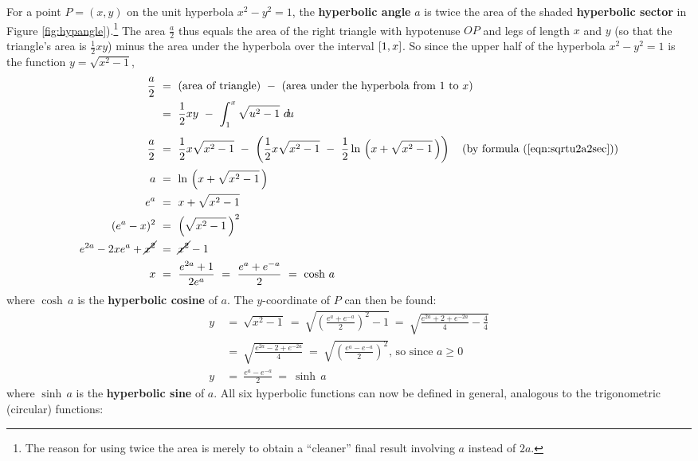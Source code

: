 For a point $P=(x,y)$ on the unit hyperbola $x^2-y^2=1$, the \textbf{hyperbolic
angle} $a$ is twice the area of the shaded
\textbf{hyperbolic sector} in Figure
\ref{fig:hypangle}).\footnote{The reason for using twice the area is
merely to obtain a ``cleaner'' final result involving $a$ instead of $2a$.} The
area $\frac{a}{2}$ thus equals the area of the right
triangle with hypotenuse $OP$ and legs of length $x$ and $y$ (so that the
triangle's area is $\frac{1}{2}xy$) minus the area under the hyperbola over the
interval $\lbrack 1,x \rbrack$. So since the upper half of the hyperbola $x^2-y^2=1$
is the function $y=\sqrt{x^2-1}$,
\begin{align*}
\frac{a}{2} ~&=~ \text{(area of triangle)} ~-~
                 \text{(area under the hyperbola from $1$ to $x$)}\\
&=~ \frac{1}{2}xy ~-~ \int_1^x \sqrt{u^2-1}~d\!u\\[4pt]
\frac{a}{2} ~&=~ \frac{1}{2}x\sqrt{x^2-1} ~-~ \left(\frac{1}{2}x\sqrt{x^2-1} ~-~
    \frac{1}{2}\ln\,\left(x + \sqrt{x^2-1}\,\right)\right)
    \quad\text{(by formula (\ref{eqn:sqrtu2a2sec}))}\\[2pt]
a ~&=~ \ln\,\left(x + \sqrt{x^2-1}\,\right)\\
e^a ~&=~ x + \sqrt{x^2-1}\\
(e^a - x)^2 ~&=~ \left(\sqrt{x^2-1}\,\right)^2\\
e^{2a} - 2xe^a + \cancel{x^2} ~&=~ \cancel{x^2} - 1\\
x ~&=~ \frac{e^{2a} + 1}{2e^a} ~=~ \frac{e^a + e^{-a}}{2} ~=~ \cosh\,a
\end{align*}
where $\cosh\,a$ is the \textbf{hyperbolic cosine}
of $a$.
\newpage
The $y$-coordinate of $P$ can then be found:
\begin{align*}
y ~&=~ \sqrt{x^2 - 1} ~=~ \sqrt{\left(\frac{e^a + e^{-a}}{2}\right)^2 - 1} ~=~
       \sqrt{\frac{e^{2a} + 2 + e^{-2a}}{4} - \frac{4}{4}}\\[4pt]
&=~    \sqrt{\frac{e^{2a} - 2 + e^{-2a}}{4}} ~=~
       \sqrt{\left(\frac{e^a - e^{-a}}{2}\right)^2} \text{, so since $a \ge 0$}\\[4pt]
y ~&=~ \frac{e^a - e^{-a}}{2} ~=~ \sinh\,a
\end{align*}
where $\sinh\,a$ is the \textbf{hyperbolic sine} of $a$.
All six hyperbolic functions can now be defined in general, analogous to the
trigonometric (circular) functions:

